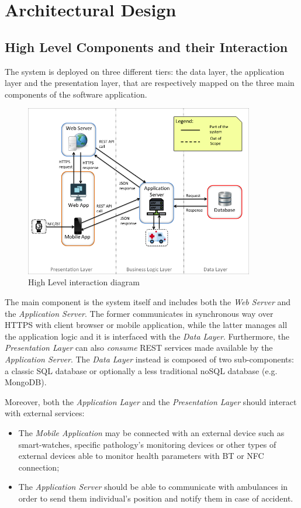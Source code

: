 \documentclass[a4paper]{article}
\begin{document}
\newpage
\section{Architectural Design}
\subsection{High Level Components and their Interaction}
The system is deployed on three different tiers: the data layer, the application layer and the presentation layer, that are respectively mapped on the three main components of the software application.
\begin{figure}[!htpb]
    	\centering
    	\includegraphics[width=100mm,keepaspectratio]{images/highlevel.png}
    	\caption{High Level interaction diagram}
\end{figure}

The main component is the system itself and includes both the \textit{Web Server} and the \textit{Application Server}. The former communicates in synchronous way over HTTPS with client browser or mobile application, while the latter manages all the application logic and it is interfaced with the \textit{Data Layer}. Furthermore, the \textit{Presentation Layer} can also \textit{consume} REST services made available by the \textit{Application Server}. The \textit{Data Layer} instead is composed of two sub-components: a classic SQL database or optionally a less traditional noSQL database (e.g. MongoDB).

Moreover, both the \textit{Application Layer} and the \textit{Presentation Layer} should interact with external services:
\begin{itemize}
    \item The \textit{Mobile Application} may be connected with an external device such as smart-watches, specific pathology's monitoring devices or other types of external devices able to monitor health parameters with BT or NFC connection;
    \item The \textit{Application Server} should be able to communicate with ambulances in order to send them individual's position and notify them in case of accident.
\end{itemize}
\end{document}

